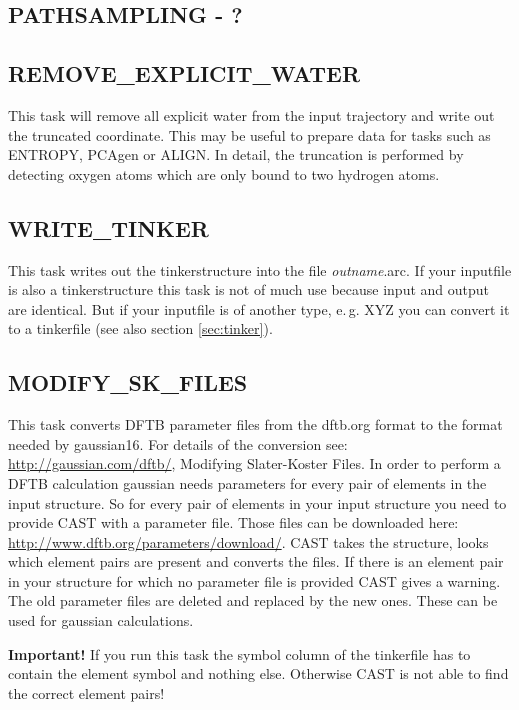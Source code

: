 \documentclass[10pt,a4paper]{article} %
\newif\ifdevmode %
\begin{document}
	\subsection{PATHSAMPLING - ?}	
	\ifdevmode \colorbox{red}{write something here} \fi	
	
	\subsection{REMOVE\_EXPLICIT\_WATER}	
	This task will remove all explicit water from the input trajectory and write out the truncated coordinate. This may be useful to prepare data for tasks such as ENTROPY, PCAgen or ALIGN. In detail, the truncation is performed by detecting oxygen atoms which are only bound to two hydrogen atoms.\\
	
	\subsection{WRITE\_TINKER}
	This task writes out the tinkerstructure into the file \textit{outname}.arc. If your inputfile is also a tinkerstructure this task is not of much use because input and output are identical. But if your inputfile is of another type, e.\,g. XYZ you can convert it to a tinkerfile (see also section \ref{sec:tinker}).
	
	\subsection{MODIFY\_SK\_FILES}
	This task converts DFTB parameter files from the dftb.org format to the format needed by gaussian16. For details of the conversion see: \url{http://gaussian.com/dftb/}, Modifying Slater-Koster Files. In order to perform a DFTB calculation gaussian needs parameters for every pair of elements in the input structure. So for every pair of elements in your input structure you need to provide CAST with a parameter file. Those files can be downloaded here: \url{http://www.dftb.org/parameters/download/}. CAST takes the structure, looks which element pairs are present and converts the files. If there is an element pair in your structure for which no parameter file is provided CAST gives a warning. The old parameter files are deleted and replaced by the new ones. These can be used for gaussian calculations.
	
\textbf{Important!} If you run this task the symbol column of the tinkerfile has to contain the element symbol and nothing else. Otherwise CAST is not able to find the correct element pairs!
		
\end{document}
